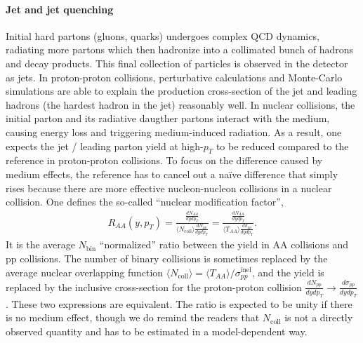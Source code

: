 \paragraph{Jet and jet quenching}
Initial hard partons (gluons, quarks) undergoes complex QCD dynamics, radiating more partons which then hadronize into a collimated bunch of hadrons and decay products.
This final collection of particles is observed in the detector as jets.
In proton-proton collisions, perturbative calculations and Monte-Carlo simulations are able to explain the production cross-section of the jet and leading hadrons (the hardest hadron in the jet) reasonably well.
In nuclear collisions, the initial parton and its radiative daugther partons interact with the medium, causing energy loss and triggering medium-induced radiation.
As a result, one expects the jet / leading parton yield at high-$p_T$ to be reduced compared to the reference in proton-proton collisions.
To focus on the difference caused by medium effects, the reference has to cancel out a na\"ive difference that simply rises because there are more effective nucleon-nucleon collisions in a nuclear collision.
One defines the so-called ``nuclear modification factor'',
\begin{eqnarray}
R_{AA}(y, p_T) = \frac{\frac{dN_{AA}}{dy dp_T}}{\langle N_{\textrm{coll}}\rangle \frac{dN_{pp}}{dy dp_T}} = \frac{\frac{dN_{AA}}{dy dp_T}}{\langle T_{AA} \rangle \frac{d\sigma_{pp}}{dy dp_T}}.
\end{eqnarray}
It is the average $N_{\textrm{bin}}$ ``normalized'' ratio between the yield in AA collisions and pp collisions.
The number of binary collisions is sometimes replaced by the average nuclear overlapping function $\langle N_{\textrm{coll}}\rangle = \langle T_{AA} \rangle /\sigma_{pp}^{\textrm{inel}}$, and the yield is replaced by the inclusive cross-section for the proton-proton collision $\frac{dN_{pp}}{dy dp_T}\rightarrow \frac{d\sigma_{pp}}{dy dp_T}$.
These two expressions are equivalent.
The ratio is expected to be unity if there is no medium effect, though we do remind the readers that $N_{\textrm{coll}}$ is not a directly observed quantity and has to be estimated in a model-dependent way.

